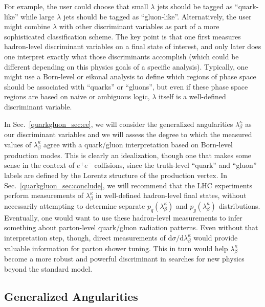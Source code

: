 \documentclass[11pt]{cernrep}
\begin{document}
For example, the user could choose that small $\lambda$ jets should be tagged as ``quark-like'' while large $\lambda$ jets should be tagged as ``gluon-like''. Alternatively, the user might combine $\lambda$ with other discriminant variables as part of a more sophisticated classification scheme.  The key point is that one first measures hadron-level discriminant variables on a final state of interest, and only later does one interpret exactly what those discriminants accomplish (which could be different depending on this physics goals of a specific analysis).  Typically, one might use a Born-level or eikonal analysis to define which regions of phase space should be associated with ``quarks'' or ``gluons'', but even if these phase space regions are based on naive or ambiguous logic, $\lambda$ itself is a well-defined discriminant variable.

In Sec.~\ref{quarkgluon_sec:ee}, we will consider the generalized
angularities $\lambda_{\beta}^\kappa$ as our discriminant variables
and we will assess the degree to which the measured values of
$\lambda_{\beta}^\kappa$ agree with a quark/gluon interpretation based
on Born-level production modes.  This is clearly an idealization,
though one that makes some sense in the context of $e^+e^-$
collisions, since the truth-level ``quark'' and ``gluon'' labels are
defined by the Lorentz structure of the production vertex.  In
Sec.~\ref{quarkgluon_sec:conclude}, we will recommend that the LHC
experiments perform measurements of $\lambda_\beta^\kappa$ in
well-defined hadron-level final states, without necessarily attempting
to determine separate $p_q(\lambda_\beta^\kappa)$ and
$p_g(\lambda_\beta^\kappa)$ distributions.  Eventually, one would want
to use these hadron-level measurements to infer something about
parton-level quark/gluon radiation patterns.  Even without that
interpretation step, though, direct measurements of $\text{d} \sigma /
\text{d} \lambda_\beta^\kappa$ would provide valuable information for
parton shower tuning.  This in turn would help $\lambda_\beta^\kappa$ become a more robust and powerful discriminant in searches for new physics beyond the standard model. 

\subsection{Generalized Angularities}
\label{quarkgluon_sec:genang}
\end{document}

